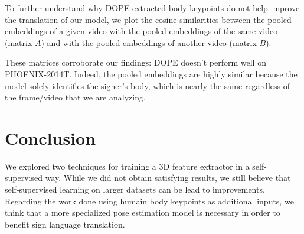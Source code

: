 \documentclass[final]{cvpr}
\begin{document}
To further understand why DOPE-extracted body keypoints do not help improve the translation of our model, we plot the cosine similarities between the pooled embeddings of a given video with the pooled embeddings of the same video (matrix $A$) and with the pooled embeddings of another video (matrix $B$).


These matrices corroborate our findings: DOPE doesn't perform well on PHOENIX-2014T. Indeed, the pooled embeddings are highly similar because the model solely identifies the signer's body, which is nearly the same regardless of the frame/video that we are analyzing.
\section{Conclusion}
We explored two techniques for training a 3D feature extractor in a self-supervised way. While we did not obtain satisfying results, we still believe that self-supervised learning on larger datasets can be lead to improvements. Regarding the work done using humain body keypoints as additional inputs, we think that a more specialized pose estimation model is necessary in order to benefit sign language translation.


{\small


}
\end{document}
